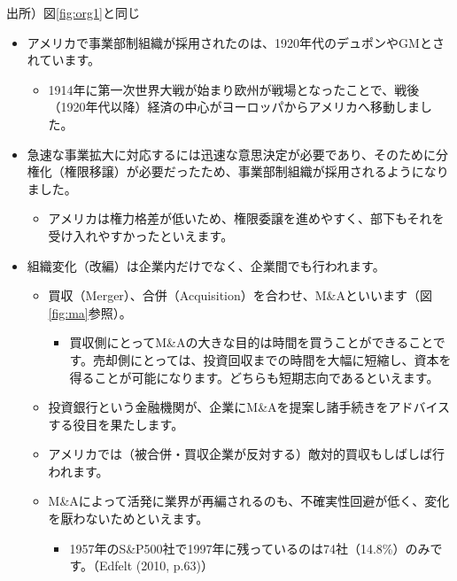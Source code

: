 \documentclass[
]{book}
\providecommand{\tightlist}{%
  \setlength{\itemsep}{0pt}\setlength{\parskip}{0pt}}
\begin{document}
出所）図\ref{fig:org1}と同じ

\begin{itemize}
\item
  アメリカで事業部制組織が採用されたのは、1920年代のデュポンやGMとされています。

  \begin{itemize}
  \tightlist
  \item
    1914年に第一次世界大戦が始まり欧州が戦場となったことで、戦後（1920年代以降）経済の中心がヨーロッパからアメリカへ移動しました。
  \end{itemize}
\item
  急速な事業拡大に対応するには迅速な意思決定が必要であり、そのために分権化（権限移譲）が必要だったため、事業部制組織が採用されるようになりました。
  　

  \begin{itemize}
  \tightlist
  \item
    アメリカは権力格差が低いため、権限委譲を進めやすく、部下もそれを受け入れやすかったといえます。
  \end{itemize}
\item
  組織変化（改編）は企業内だけでなく、企業間でも行われます。

  \begin{itemize}
  \item
    買収（Merger）、合併（Acquisition）を合わせ、M\&Aといいます（図\ref{fig:ma}参照）。

    \begin{itemize}
    \tightlist
    \item
      買収側にとってM\&Aの大きな目的は時間を買うことができることです。売却側にとっては、投資回収までの時間を大幅に短縮し、資本を得ることが可能になります。どちらも短期志向であるといえます。
    \end{itemize}
  \item
    投資銀行という金融機関が、企業にM\&Aを提案し諸手続きをアドバイスする役目を果たします。
  \item
    アメリカでは（被合併・買収企業が反対する）敵対的買収もしばしば行われます。
  \item
    M\&Aによって活発に業界が再編されるのも、不確実性回避が低く、変化を厭わないためといえます。

    \begin{itemize}
    \tightlist
    \item
      1957年のS\&P500社で1997年に残っているのは74社（14.8\%）のみです。（Edfelt (2010, p.63)）
    \end{itemize}
  \end{itemize}
\end{itemize}
\end{document}
